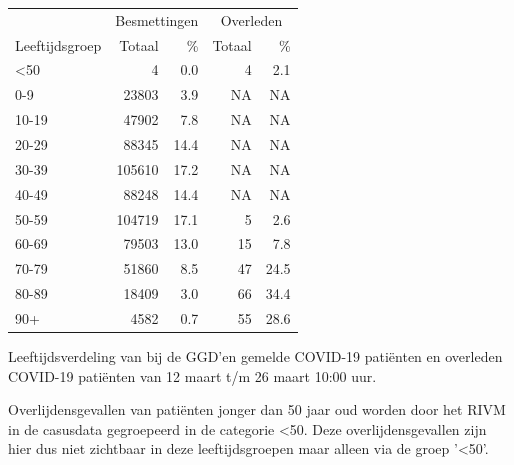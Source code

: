 \documentclass[
  english,
  man,floatsintext]{apa6}
\begin{document}
\begin{table}
\centering\begingroup\fontsize{11}{13}\selectfont

\begin{threeparttable}
\begin{tabular}{lrrrr}
\toprule
\multicolumn{1}{c}{ } & \multicolumn{2}{c}{Besmettingen} & \multicolumn{2}{c}{Overleden} \\
\cmidrule(l{3pt}r{3pt}){2-3} \cmidrule(l{3pt}r{3pt}){4-5}
Leeftijdsgroep & Totaal & \% & Totaal & \%\\
\midrule
<50 & 4 & 0.0 & 4 & 2.1\\
0-9 & 23803 & 3.9 & NA & NA\\
10-19 & 47902 & 7.8 & NA & NA\\
20-29 & 88345 & 14.4 & NA & NA\\
30-39 & 105610 & 17.2 & NA & NA\\
40-49 & 88248 & 14.4 & NA & NA\\
50-59 & 104719 & 17.1 & 5 & 2.6\\
60-69 & 79503 & 13.0 & 15 & 7.8\\
70-79 & 51860 & 8.5 & 47 & 24.5\\
80-89 & 18409 & 3.0 & 66 & 34.4\\
90+ & 4582 & 0.7 & 55 & 28.6\\
\bottomrule
\end{tabular}
\begin{tablenotes}
\item[1] Leeftijdsverdeling van bij de GGD’en gemelde COVID-19 patiënten en overleden COVID-19 patiënten van 12 maart t/m 26 maart 10:00 uur.
\item[2] Overlijdensgevallen van patiënten jonger dan 50 jaar oud worden door het RIVM in de casusdata gegroepeerd in de categorie <50. Deze overlijdensgevallen zijn hier dus niet zichtbaar in deze leeftijdsgroepen maar alleen via de groep '<50'.
\end{tablenotes}
\end{threeparttable}
\endgroup{}
\end{table}

\newpage
\end{document}
